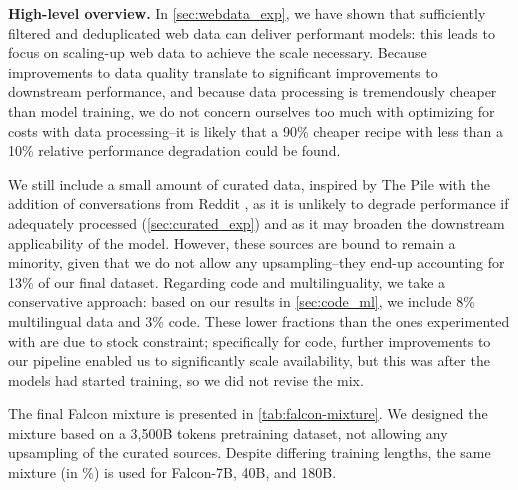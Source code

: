 \documentclass{article}
\begin{document}
\textbf{High-level overview.} In \cref{sec:webdata_exp}, we have shown that sufficiently filtered and deduplicated web data can deliver performant models: this leads to focus on scaling-up web data to achieve the scale necessary. Because improvements to data quality translate to significant improvements to downstream performance, and because data processing is tremendously cheaper than model training, we do not concern ourselves too much with optimizing for costs with data processing--it is likely that a 90\% cheaper recipe with less than a 10\% relative performance degradation could be found. 

We still include a small amount of curated data, inspired by The Pile \citep{gao2020pile} with the addition of conversations from Reddit \citep{baumgartner2020pushshift}, as it is unlikely to degrade performance if adequately processed (\cref{sec:curated_exp}) and as it may broaden the downstream applicability of the model. However, these sources are bound to remain a minority, given that we do not allow any upsampling--they end-up accounting for 13\% of our final dataset. Regarding code and multilinguality, we take a conservative approach: based on our results in \cref{sec:code_ml}, we include 8\% multilingual data and 3\% code. These lower fractions than the ones experimented with are due to stock constraint; specifically for code, further improvements to our pipeline enabled us to significantly scale availability, but this was after the models had started training, so we did not revise the mix.

The final Falcon mixture is presented in \cref{tab:falcon-mixture}. We designed the mixture based on a 3,500B tokens pretraining dataset, not allowing any upsampling of the curated sources. Despite differing training lengths, the same mixture (in \%) is used for Falcon-7B, 40B, and 180B. 
\end{document}
